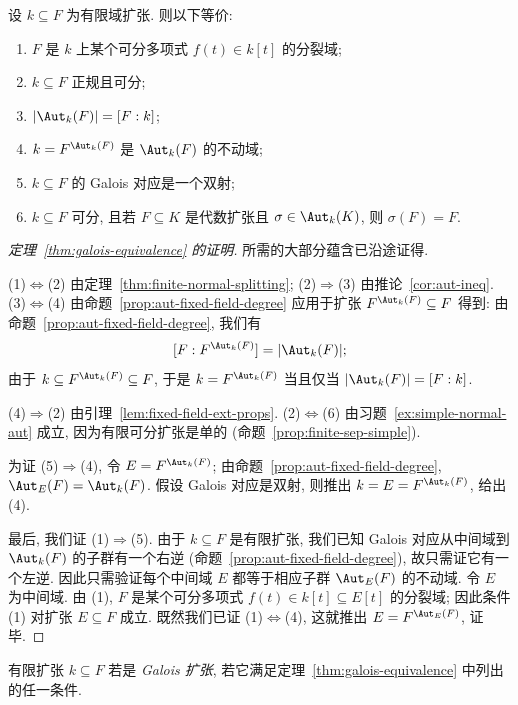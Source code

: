 \begin{theorem}\label{thm:galois-equivalence}
设 $k\subseteq F$ 为有限域扩张. 则以下等价:
\begin{enumerate}
\item[(1)] $F$ 是 $k$ 上某个可分多项式 $f(t)\in k[t]$ 的分裂域;
\item[(2)] $k\subseteq F$ 正规且可分;
\item[(3)] $|\Aut_k(F)|=[F:k]$;
\item[(4)] $k=F^{\Aut_k(F)}$ 是 $\Aut_k(F)$ 的不动域;
\item[(5)] $k\subseteq F$ 的 Galois 对应是一个双射;
\item[(6)] $k\subseteq F$ 可分, 且若 $F\subseteq K$ 是代数扩张且 $\sigma\in\Aut_k(K)$, 则 $\sigma(F)=F$.
\end{enumerate}
\end{theorem}

\begin{proof}[定理~\ref{thm:galois-equivalence} 的证明]
所需的大部分蕴含已沿途证得.

(1)$\Longleftrightarrow$(2) 由定理~\ref{thm:finite-normal-splitting}; (2)$\Longrightarrow$(3) 由推论~\ref{cor:aut-ineq}. (3)$\Longleftrightarrow$(4) 由命题~\ref{prop:aut-fixed-field-degree} 应用于扩张 $F^{\Aut_k(F)}\subseteq F$ 得到: 由命题~\ref{prop:aut-fixed-field-degree}, 我们有
\[
[F:F^{\Aut_k(F)}]=|\Aut_k(F)|;
\]
由于 $k\subseteq F^{\Aut_k(F)}\subseteq F$, 于是 $k=F^{\Aut_k(F)}$ 当且仅当 $|\Aut_k(F)|=[F:k]$.

(4)$\Longrightarrow$(2) 由引理~\ref{lem:fixed-field-ext-props}. (2)$\Longleftrightarrow$(6) 由习题~\ref{ex:simple-normal-aut} 成立, 因为有限可分扩张是单的 (命题~\ref{prop:finite-sep-simple}).

为证 (5)$\Longrightarrow$(4), 令 $E=F^{\Aut_k(F)}$; 由命题~\ref{prop:aut-fixed-field-degree}, $\Aut_E(F)=\Aut_k(F)$. 假设 Galois 对应是双射, 则推出 $k=E=F^{\Aut_k(F)}$, 给出 (4).

最后, 我们证 (1)$\Longrightarrow$(5). 由于 $k\subseteq F$ 是有限扩张, 我们已知 Galois 对应从中间域到 $\Aut_k(F)$ 的子群有一个右逆 (命题~\ref{prop:aut-fixed-field-degree}), 故只需证它有一个左逆. 因此只需验证每个中间域 $E$ 都等于相应子群 $\Aut_E(F)$ 的不动域. 令 $E$ 为中间域. 由 (1), $F$ 是某个可分多项式 $f(t)\in k[t]\subseteq E[t]$ 的分裂域; 因此条件 (1) 对扩张 $E\subseteq F$ 成立. 既然我们已证 (1)$\Longleftrightarrow$(4), 这就推出 $E=F^{\Aut_E(F)}$, 证毕.
\end{proof}

\begin{definition}\label{def:galois-extension}
有限扩张 $k\subseteq F$ 若是 \emph{Galois 扩张}, 若它满足定理~\ref{thm:galois-equivalence} 中列出的任一条件.
\end{definition}

